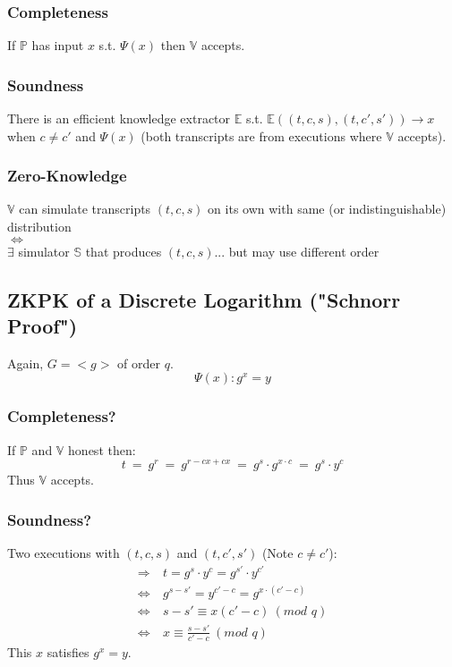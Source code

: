 \documentclass{report}
\begin{document}
			\subsubsection{Completeness}
			\subsectionstart
				If $\mathbb{P}$ has input $x$ s.t. $\Psi (x)$ then $\mathbb{V}$ accepts.
			\sectionend
			\subsubsection{Soundness}
			\subsectionstart
				There is an efficient knowledge extractor $\mathbb{E}$ s.t. $\mathbb{E}((t,c,s), (t,c',s')) \rightarrow x$ when $c \neq c'$ and $\Psi (x)$ (both transcripts are from executions where $\mathbb{V}$ accepts).
			\sectionend
			\subsubsection{Zero-Knowledge}
			\subsectionstart
				$\mathbb{V}$ can simulate transcripts $(t,c,s)$ on its own with same (or indistinguishable) distribution \\
				$\Leftrightarrow$ \\
				$\exists$ simulator $\mathbb{S}$ that produces $(t,c,s)$... but may use different order
			\sectionend
		\sectionend
		\subsection{ZKPK of a Discrete Logarithm ("Schnorr Proof")}
		\subsectionstart
			Again, $G = <g>$ of order $q$.
			\[
				\Psi (x): g^x = y
			\]
			\begin{tikzpicture}
			\end{tikzpicture}
			\subsubsection{Completeness?}
			\subsectionstart
				If $\mathbb{P}$ and $\mathbb{V}$ honest then:
				\[
					t \ = \ g^r \ = \ g^{r-cx+cx} \ = \ g^s \cdot g^{x \cdot c} \ = \ g^s \cdot y^c
				\]
				Thus $\mathbb{V}$ accepts.
			\sectionend
			\subsubsection{Soundness?}
			\subsectionstart
				Two executions with $(t,c,s)$ and $(t,c',s')$ (Note $c \neq c'$):
				\begin{align*}
					\Rightarrow & \ t = g^s \cdot y^c = g^{s'} \cdot y^{c'} \\
					\Leftrightarrow & \ g^{s-s'} = y^{c'-c} = g^{x \cdot (c' - c)} \\
					\Leftrightarrow & \ s - s' \equiv x (c' - c) \ (\textit{mod } q) \\
					\Leftrightarrow & \ x \equiv \frac{s-s'}{c'-c} \ (\textit{mod } q)
				\end{align*}
				This $x$ satisfies $g^x = y$.
			\sectionend
\end{document}
